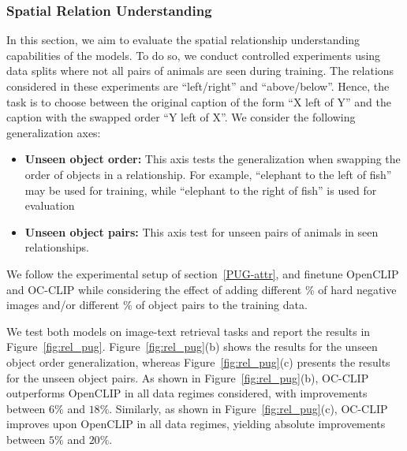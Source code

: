 \subsubsection{Spatial Relation Understanding}
\label{PUG-rel}
In this section, we aim to evaluate the spatial relationship understanding capabilities of the models. %
To do so, we conduct controlled experiments using data splits where not all pairs of animals are seen during training. The relations considered in these experiments are ``left/right'' and ``above/below''. Hence, the task is to choose between the original caption of the form ``{X} left of {Y}'' and the caption with the swapped order ``{Y} left of {X}''. We consider the following generalization axes:
\begin{itemize}
    \item \textbf{Unseen object order:} This axis tests the generalization when swapping the order of objects in a relationship. For example, ``elephant to the left of fish'' may be used for training, while ``elephant to the right of fish'' is used for evaluation
    \item \textbf{Unseen object pairs:} This axis test for unseen pairs of animals in seen relationships.
\end{itemize}
We follow the experimental setup of section~\ref{PUG-attr}, and finetune OpenCLIP and OC-CLIP while considering the effect of adding different \% of hard negative images and/or different \% of object pairs to the training data.

We test both models on image-text retrieval tasks and report the results in Figure~\ref{fig:rel_pug}. Figure~\ref{fig:rel_pug}(b) shows the results for the unseen object order generalization, whereas Figure~\ref{fig:rel_pug}(c) presents the results for the unseen object pairs. As shown in Figure~\ref{fig:rel_pug}(b), OC-CLIP outperforms OpenCLIP in all data regimes considered, with improvements between $6\%$ and $18\%$. Similarly, as shown in Figure~\ref{fig:rel_pug}(c), OC-CLIP improves upon OpenCLIP in all data regimes, yielding absolute improvements between $5\%$ and $20\%$.

